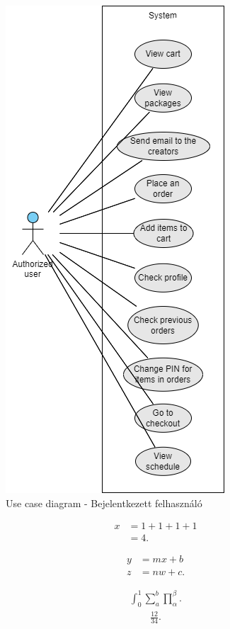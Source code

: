 \begin{figure}[!h]
	\centering
	\includegraphics[scale=0.7]{images/useCaseA}
	\caption{Use case diagram - Bejelentkezett felhasználó}
	\label{abra:useCaseA}
\end{figure}
\pagebreak

	\begin{align}
	x&=1+1+1+1\\
	&=4.
\end{align}

	\begin{align}
	y&=mx+b\nonumber\\
	z&=nw+c.
\end{align}

			\begin{align}
	\int_0^1\sum_a^b\prod_\alpha^\beta.
\end{align}
	\begin{align*}
	\frac{12}{34}.
\end{align*}
